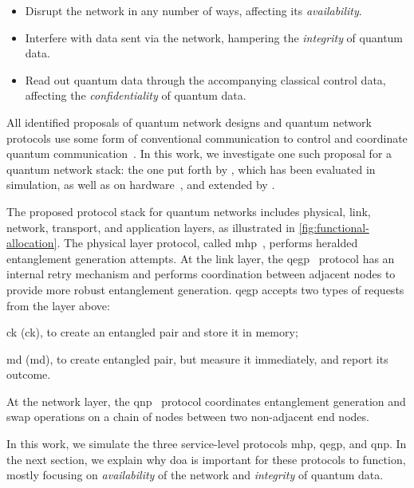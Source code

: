 \begin{itemize}
    \item Disrupt the network in any number of ways, affecting its \emph{availability}.
    \item Interfere with data sent via the network, hampering the \emph{integrity} of quantum data.
    \item Read out quantum data through the accompanying classical control data, affecting the
          \emph{confidentiality} of quantum data.
\end{itemize}

All identified proposals of quantum network designs and quantum network protocols use some form of
conventional communication to control and coordinate quantum
communication~\cite{van_meter_2013_repeaters, schoute_2016_shortcuts, joshi_2020_trusted,
pirker_2019_quantum, kozlowski_2019_towards, dahlberg_2019_egp, kozlowski_2020_qnp}. In this work,
we investigate one such proposal for a quantum network stack: the one put forth by
\textcite{dahlberg_2019_egp}, which has been evaluated in simulation, as well as on
hardware~\cite{pompili_2022_experimental}, and extended by \textcite{kozlowski_2020_qnp}.

The proposed protocol stack for quantum networks includes physical, link, network, transport, and
application layers, as illustrated in \cref{fig:functional-allocation}. The physical layer protocol,
called \acrfull{mhp}~\cite{dahlberg_2019_egp}, performs heralded entanglement generation attempts.
At the link layer, the \acrfull{qegp}~\cite{dahlberg_2019_egp} protocol has an internal retry
mechanism and performs coordination between adjacent nodes to provide more robust entanglement
generation. \acrshort{qegp} accepts two types of requests from the layer above:
%
\begin{inlinelist}
    \item \acrlong{ck} (\acrshort{ck}), to create an entangled pair and store it in memory;
    \item \acrlong{md} (\acrshort{md}), to create entangled pair, but measure it immediately, and
          report its outcome.
\end{inlinelist}
At the network layer, the \acrfull{qnp}~\cite{kozlowski_2020_qnp} protocol coordinates
entanglement generation and swap operations on a chain of nodes between two non-adjacent end nodes.

In this work, we simulate the three service-level protocols \acrshort{mhp}, \acrshort{qegp}, and
\acrshort{qnp}. In the next section, we explain why \acrfull{doa} is important for these protocols
to function, mostly focusing on \emph{availability} of the network and \emph{integrity} of quantum
data.

